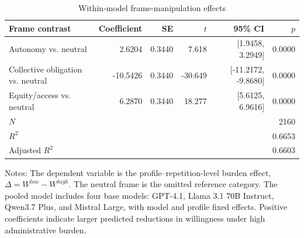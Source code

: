 \begin{table}[htbp]
\centering
\caption{Within-model frame-manipulation effects}
\label{tab:h3_frame_manipulation}
\begin{tabular}{lrrrrr}
\toprule
Frame contrast & Coefficient & SE & \(t\) & 95\% CI & \(p\) \\
\midrule
Autonomy vs. neutral & 2.6204 & 0.3440 & 7.618 & [1.9458, 3.2949] & 0.0000 \\
Collective obligation vs. neutral & -10.5426 & 0.3440 & -30.649 & [-11.2172, -9.8680] & 0.0000 \\
Equity/access vs. neutral & 6.2870 & 0.3440 & 18.277 & [5.6125, 6.9616] & 0.0000 \\
\midrule
\(N\) & \multicolumn{5}{r}{2160} \\
\(R^2\) & \multicolumn{5}{r}{0.6653} \\
Adjusted \(R^2\) & \multicolumn{5}{r}{0.6603} \\
\bottomrule
\end{tabular}
\begin{flushleft}
\footnotesize Notes: The dependent variable is the profile--repetition-level burden effect, \(\Delta = W^{low} - W^{high}\). The neutral frame is the omitted reference category. The pooled model includes four base models: GPT-4.1, Llama 3.1 70B Instruct, Qwen3.7 Plus, and Mistral Large, with model and profile fixed effects. Positive coefficients indicate larger predicted reductions in willingness under high administrative burden.
\end{flushleft}
\end{table}
